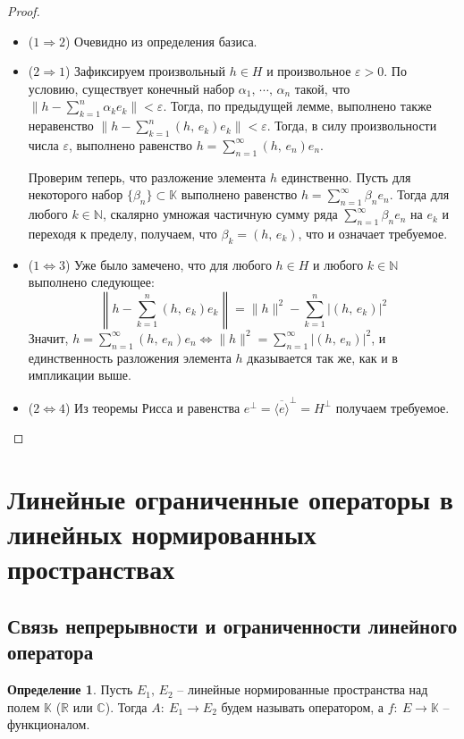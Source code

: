 \documentclass[a4paper,12pt]{article}
\theoremstyle{plain}
\theoremstyle{definition}
\newtheorem{definition}{Определение}[section]
\theoremstyle{remark}
\begin{document}
\begin{proof}
	\begin{itemize}
		\item ($1 \Rightarrow 2$) Очевидно из определения базиса.
		\item ($2 \Rightarrow 1$) Зафиксируем произвольный $h \in H$ и произвольное $\varepsilon > 0$. По условию, существует конечный набор $\alpha_1,\,\cdots,\,\alpha_n$ такой, что $\|h - \sum_{k = 1}^n \alpha_ke_k\| < \varepsilon$. Тогда, по предыдущей лемме, выполнено также неравенство $\|h - \sum_{k = 1}^n (h,\,e_k)e_k\| < \varepsilon$. Тогда, в силу произвольности числа $\varepsilon$, выполнено равенство $h = \sum_{n = 1}^\infty (h,\, e_n)e_n$.

		      Проверим теперь, что разложение элемента $h$ единственно. Пусть для некоторого набор $\{\beta_n\} \subset \mathbb{K}$ выполнено равенство $h = \sum_{n = 1}^\infty \beta_ne_n$. Тогда для любого $k \in \mathbb{N}$, скалярно умножая частичную сумму ряда $\sum_{n = 1}^\infty \beta_ne_n$ на $e_k$ и переходя к пределу, получаем, что $\beta_k = (h,\,e_k)$, что и означает требуемое.
		\item ($1 \Leftrightarrow 3$) Уже было замечено, что для любого $h \in H$ и любого $k \in \mathbb{N}$ выполнено следующее:
		      \[
			      \left\|h - \sum_{k = 1}^n (h,\, e_k)e_k\right\| = \|h\|^2 - \sum_{k = 1}^n \vert(h,\, e_k)\vert^2
		      \]
		      Значит, $h = \sum_{n = 1}^\infty (h,\,e_n)e_n \Leftrightarrow \|h\|^2 = \sum_{n = 1}^\infty \vert (h,\, e_n)\vert^2$, и единственность разложения элемента $h$ дказывается так же, как и в импликации выше.

		\item ($2 \Leftrightarrow 4$) Из теоремы Рисса и равенства $e^\bot = \overline{\langle e\rangle}^\bot = H^\bot$ получаем требуемое.
	\end{itemize}
\end{proof}

\section{Линейные ограниченные операторы в линейных нормированных пространствах}
\subsection{Связь непрерывности и ограниченности линейного оператора}
\begin{definition}
	Пусть $E_1,\,E_2$ -- линейные нормированные пространства над полем $\mathbb{K}$ ($\mathbb{R}$ или $\mathbb{C}$). Тогда $A :\: E_1 \to E_2$ будем называть оператором, а $f :\: E \to \mathbb{K}$ -- функционалом.
\end{definition}
\end{document}
